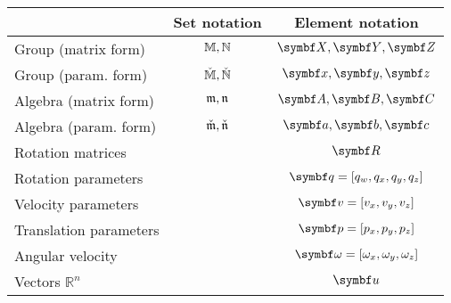 \begin{tabular}{lcc}
  \toprule
                         & Set notation & Element notation                           \\
  \midrule
  Group (matrix form)    & $\mathbb{M}, \mathbb{N}$     & $\X, \Y, \Z$                               \\
  Group (param. form)    & $\check{\mathbb{M}}, \check{\mathbb{N}}$   & $\x, \y, \z$                               \\
  Algebra (matrix form)  & $\mathfrak{m}, \mathfrak{n}$   & $\A, \B, \C$                               \\
  Algebra (param. form)  & $\check{\mathfrak{m}}, \check{\mathfrak{n}}$ & $\a, \b, \c$                               \\
  Rotation matrices      &              & $\bR$                                      \\
  Rotation parameters    &              & $\bq = [q_w, q_x, q_y, q_z]$               \\
  Velocity parameters    &              & $\bv = [v_x, v_y, v_z]$                    \\
  Translation parameters &              & $\bp = [p_x, p_y, p_z]$                    \\
  Angular velocity       &              & $\bomega = [\omega_x, \omega_y, \omega_z]$ \\
  Vectors $\mathbb{R}^n$ &              & $\bu$                                      \\
  \bottomrule
\end{tabular}
